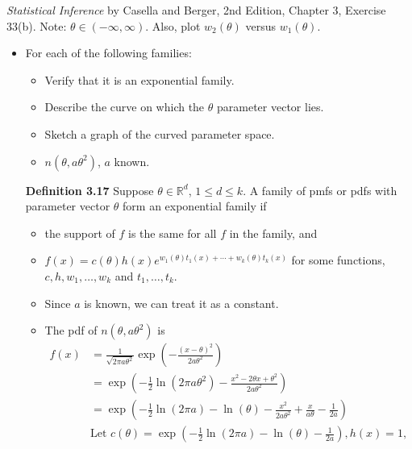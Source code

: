 \documentclass[12pt]{article}
\newcommand{\R}{{\mathbb R}}
\newenvironment{problem}[2][Problem]{\begin{trivlist}
\item[\hskip \labelsep {\bfseries #1}\hskip \labelsep {\bfseries #2.}]}
{\end{trivlist}}
\begin{document}
\begin{problem}{7}
  \textit{Statistical Inference} by Casella and Berger, 2nd Edition, Chapter 3, 
  Exercise 33(b). Note: $\theta \in (-\infty, \infty)$. Also, 
  plot $w_2(\theta)$ versus $w_1(\theta)$.
  \begin{itemize}
    \item [33.] For each of the following families:
    \begin{itemize}
      \item [(i)] Verify that it is an exponential family.
      \item [(ii)] Describe the curve on which the $\theta$ parameter
      vector lies.
      \item [(iii)] Sketch a graph of the curved parameter space.
    \end{itemize}
    \begin{itemize}
      \item [(b)] $n(\theta, a\theta^2)$, $a$ known.
    \end{itemize}
    \textbf{Definition 3.17} Suppose $\theta \in \R^d$, $1 \leq d \leq k$. 
    A family of pmfs or pdfs with parameter vector $\theta$ form 
    an exponential family if
    \begin{itemize}
      \item the support of $f$ is the same for all $f$ in the family, and
      \item $f (x) = c(\theta)h(x)e^{w_1(\theta)t_1(x)+\cdots+w_k(\theta)t_k(x)}$ 
      for some functions, $c, h, w_1, \dots , w_k$ and $t_1, \dots , t_k$.
    \end{itemize}
    \begin{itemize}
      \item [(b)] Since $a$ is known, we can treat it as a constant.
      \item [(i)] The pdf of $n(\theta, a\theta^2)$ is
      \[
        \begin{aligned}
          f(x) &= \frac{1}{\sqrt{2\pi a \theta^2}} 
          \exp\left( -\frac{(x - \theta)^2}{2a\theta^2} \right) \\
          &= \exp\left( -\frac{1}{2} \ln(2\pi a \theta^2) - 
          \frac{x^2 - 2\theta x + \theta^2}{2a\theta^2} \right) \\
          &= \exp\left( -\frac{1}{2} \ln(2\pi a) - 
          \ln(\theta) - \frac{x^2}{2a\theta^2} + 
          \frac{x}{a\theta} - \frac{1}{2a} \right) \\
          &\text{Let } c(\theta) = \exp\left( -\frac{1}{2} \ln(2\pi a) - 
          \ln(\theta) - \frac{1}{2a} \right), h(x) = 1,\\

\end{aligned}\]
\end{itemize}
\end{itemize}
\end{problem}
\end{document}

